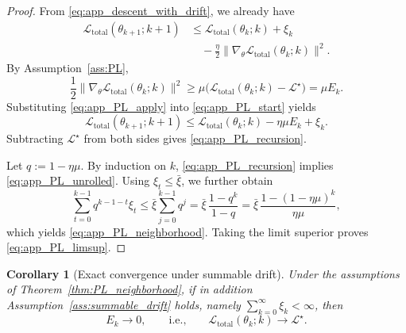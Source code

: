 \documentclass{article}
\theoremstyle{plain}
\newtheorem{corollary}[theorem]{Corollary}
\theoremstyle{definition}
\theoremstyle{remark}
\begin{document}
\begin{proof}
	From \eqref{eq:app_descent_with_drift}, we already have
	\begin{equation}
		\begin{split}
			\mathcal{L}_{\mathrm{total}}(\theta_{k+1};k+1)
			&\leqslant
			\mathcal{L}_{\mathrm{total}}(\theta_k;k)
			+
			\xi_k \\
			&\quad
			-
			\frac{\eta}{2}
			\bigl\|
			\nabla_{\theta}\mathcal{L}_{\mathrm{total}}(\theta_k;k)
			\bigr\|^2.
		\end{split}
		\label{eq:app_PL_start}
	\end{equation}
	By Assumption~\ref{ass:PL},
	\begin{equation}
		\frac{1}{2}
		\bigl\|
		\nabla_{\theta}\mathcal{L}_{\mathrm{total}}(\theta_k;k)
		\bigr\|^2
		\geqslant
		\mu
		\bigl(
		\mathcal{L}_{\mathrm{total}}(\theta_k;k)-\mathcal{L}^{\star}
		\bigr)
		=
		\mu E_k.
		\label{eq:app_PL_apply}
	\end{equation}
	Substituting \eqref{eq:app_PL_apply} into
	\eqref{eq:app_PL_start} yields
	\begin{equation}
		\mathcal{L}_{\mathrm{total}}(\theta_{k+1};k+1)
		\leqslant
		\mathcal{L}_{\mathrm{total}}(\theta_k;k)
		-
		\eta\mu E_k
		+
		\xi_k.
		\label{eq:app_PL_mid}
	\end{equation}
	Subtracting $\mathcal{L}^{\star}$ from both sides gives
	\eqref{eq:app_PL_recursion}.
	
	Let $q:=1-\eta\mu$.
	By induction on $k$, \eqref{eq:app_PL_recursion} implies
	\eqref{eq:app_PL_unrolled}.
	Using $\xi_t\leqslant \bar\xi$, we further obtain
	\begin{equation}
		\sum_{t=0}^{k-1}q^{k-1-t}\xi_t
		\leqslant
		\bar\xi\sum_{j=0}^{k-1}q^j
		=
		\bar\xi\,
		\frac{1-q^k}{1-q}
		=
		\bar\xi\,
		\frac{1-(1-\eta\mu)^k}{\eta\mu},
		\label{eq:app_geometric_series}
	\end{equation}
	which yields \eqref{eq:app_PL_neighborhood}. Taking the limit superior
	proves \eqref{eq:app_PL_limsup}.
\end{proof}

\begin{corollary}[Exact convergence under summable drift]
	\label{cor:PL_exact_conv}
	Under the assumptions of Theorem~\ref{thm:PL_neighborhood}, if in
	addition Assumption~\ref{ass:summable_drift} holds, namely
	$\sum_{k=0}^{\infty}\xi_k<\infty$, then
	\begin{equation}
		E_k\to 0,
		\qquad\text{i.e.,}\qquad
		\mathcal{L}_{\mathrm{total}}(\theta_k;k)\to \mathcal{L}^{\star}.
		\label{eq:app_PL_exact_conv}
	\end{equation}
\end{corollary}
\end{document}
